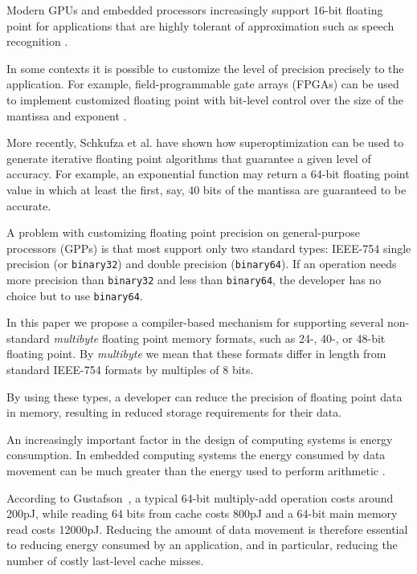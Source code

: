 \documentclass{sig-alternate-05-2015}
\newcommand{\mt}[1]{\texttt{#1}}
\begin{document}
Modern GPUs and embedded processors increasingly support 16-bit floating point
for applications that are highly tolerant of approximation such as speech
recognition \cite{dixon2009fast}.

In some contexts it is possible to customize the level of precision precisely
to the application. For example, field-programmable gate arrays (FPGAs) can be
used to implement customized floating point with bit-level control over the
size of the mantissa and exponent \cite{de2009generating,tong2000reducing}.

More recently, Schkufza et al. \cite{schkufza2014stochastic} have shown how
superoptimization can be used to generate iterative floating point algorithms
that guarantee a given level of accuracy. For example, an exponential
function may return a 64-bit floating point value in which at least the first,
say, 40 bits of the mantissa are guaranteed to be accurate.

A problem with customizing floating point precision on general-purpose
processors (GPPs) is that most support only two standard types: IEEE-754 single
precision (or \mt{binary32}) and double precision (\mt{binary64}). If an
operation needs more precision than \mt{binary32} and less than
\mt{binary64}, the developer has no choice but to use \mt{binary64}.





In this paper we propose a compiler-based mechanism for supporting several
non-standard \emph{multibyte} floating point memory formats, such as 24-, 40-,
or 48-bit floating point. By \emph{multibyte} we mean that these formats differ
in length from standard IEEE-754 formats by multiples of 8 bits.

By using these types, a developer can reduce the precision of floating point
data in memory, resulting in reduced storage requirements for their data.

An increasingly important factor in the design of computing systems is energy
consumption. In embedded computing systems the energy consumed by data movement
can be much greater than the energy used to perform arithmetic
\cite{dally2008efficient}.

According to Gustafson~\cite{gustafson}, a typical 64-bit multiply-add
operation costs around 200pJ, while reading 64 bits from cache costs 800pJ and
a 64-bit main memory read costs 12000pJ. Reducing the amount of data movement
is therefore essential to reducing energy consumed by an application, and in
particular, reducing the number of costly last-level cache misses.
\end{document}
